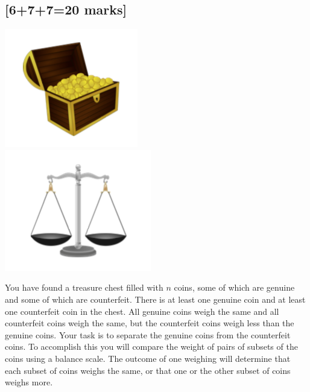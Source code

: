 \documentclass[12pt]{article}
\begin{document}
\subsection{[6+7+7=20 marks]}
\begin{center}
        \includegraphics[scale=0.05]{chest.png} 
\mbox{~~~~~~~~~~~~~~~~~~~~~~}
        \includegraphics[scale=0.05]{balance.png}
\end{center}
You have found a treasure chest filled with $n$ coins, some of which
are genuine and some of which are counterfeit.  There is at least one
genuine coin and at least one counterfeit coin in the chest.
All genuine coins weigh the same and all counterfeit coins weigh the
same, but the counterfeit coins weigh less than the genuine coins.  
Your task is to separate the genuine coins from the counterfeit
coins.  To accomplish this you will compare the weight of pairs of
subsets of the coins using a balance scale.  The outcome of one weighing
will determine that each subset of coins weighs the same, or that one
or the other subset of coins weighs more.
\end{document}
